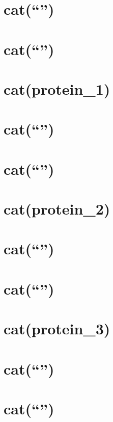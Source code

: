 \documentclass[]{article}
\begin{document}
\section{\texorpdfstring{cat(``\n'')}{cat()}}\label{cat-2}

\section{\texorpdfstring{cat(``\n'')}{cat()}}\label{cat-3}

\section{cat(protein\_1)}\label{catprotein_1}

\section{\texorpdfstring{cat(``\n'')}{cat()}}\label{cat-4}

\section{\texorpdfstring{cat(``\n'')}{cat()}}\label{cat-5}

\section{cat(protein\_2)}\label{catprotein_2}

\section{\texorpdfstring{cat(``\n'')}{cat()}}\label{cat-6}

\section{\texorpdfstring{cat(``\n'')}{cat()}}\label{cat-7}

\section{cat(protein\_3)}\label{catprotein_3}

\section{\texorpdfstring{cat(``\n'')}{cat()}}\label{cat-8}

\section{\texorpdfstring{cat(``\n'')}{cat()}}\label{cat-9}
\end{document}
